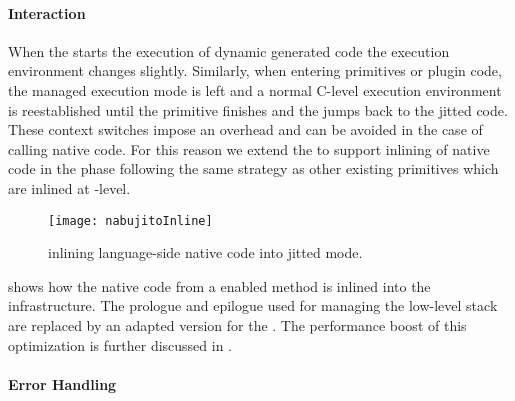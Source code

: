 \paragraph{\JIT Interaction}

When the \PH \VM starts the execution of dynamic generated code the execution environment changes slightly.
Similarly, when entering primitives or plugin code, the managed execution mode is left and a normal C-level execution environment is reestablished until the primitive finishes and the \VM jumps back to the jitted code.
These context switches impose an overhead and can be avoided in the case of calling native code.
For this reason we extend the \VM to support inlining of native code in the \JIT phase following the same strategy as other existing primitives which are inlined at \JIT-level.
%
\begin{figure}[ht]
	\centering
	\texttt{[image: nabujitoInline]}
	\caption[\B \JIT Interaction]{\B inlining language-side native code into jitted mode.}
\end{figure}
%
 shows how the native code from a \B enabled method is inlined into the \JIT infrastructure.
The \B prologue and epilogue used for managing the low-level stack are replaced by an adapted version for the \JIT.
The performance boost of this optimization is further discussed in .


\paragraph{Error Handling}

